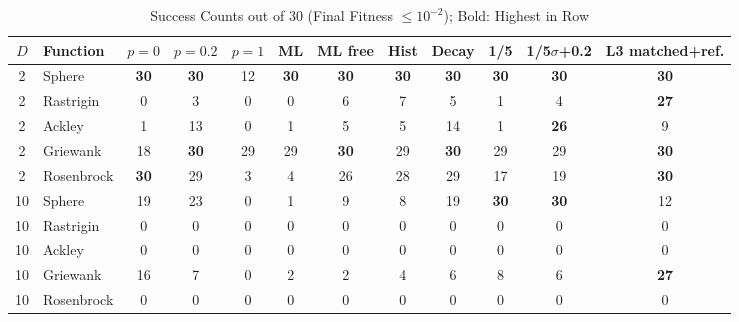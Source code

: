 \documentclass[conference]{IEEEtran}
\begin{document}
\begin{table}[t]
\centering
\caption{Success Counts out of 30 (Final Fitness $\le10^{-2}$); Bold: Highest in Row}
\label{tab:success}
\scriptsize
\setlength{\tabcolsep}{2.5pt}
\begin{tabular}{@{}clcccccccccc@{}}
\toprule
$D$ & Function & $p{=}0$ & $p{=}0.2$ & $p{=}1$ & ML & ML free & Hist & Decay & 1/5 & 1/5$\sigma$+0.2 & L3 matched+ref.\\
\midrule
2 & Sphere & \textbf{30} & \textbf{30} & 12 & \textbf{30} & \textbf{30} & \textbf{30} & \textbf{30} & \textbf{30} & \textbf{30} & \textbf{30} \\
2 & Rastrigin & 0 & 3 & 0 & 0 & 6 & 7 & 5 & 1 & 4 & \textbf{27} \\
2 & Ackley & 1 & 13 & 0 & 1 & 5 & 5 & 14 & 1 & \textbf{26} & 9 \\
2 & Griewank & 18 & \textbf{30} & 29 & 29 & \textbf{30} & 29 & \textbf{30} & 29 & 29 & \textbf{30} \\
2 & Rosenbrock & \textbf{30} & 29 & 3 & 4 & 26 & 28 & 29 & 17 & 19 & \textbf{30} \\
\midrule
10 & Sphere & 19 & 23 & 0 & 1 & 9 & 8 & 19 & \textbf{30} & \textbf{30} & 12 \\
10 & Rastrigin & 0 & 0 & 0 & 0 & 0 & 0 & 0 & 0 & 0 & 0 \\
10 & Ackley & 0 & 0 & 0 & 0 & 0 & 0 & 0 & 0 & 0 & 0 \\
10 & Griewank & 16 & 7 & 0 & 2 & 2 & 4 & 6 & 8 & 6 & \textbf{27} \\
10 & Rosenbrock & 0 & 0 & 0 & 0 & 0 & 0 & 0 & 0 & 0 & 0 \\
\bottomrule
\end{tabular}
\end{table}
\end{document}
